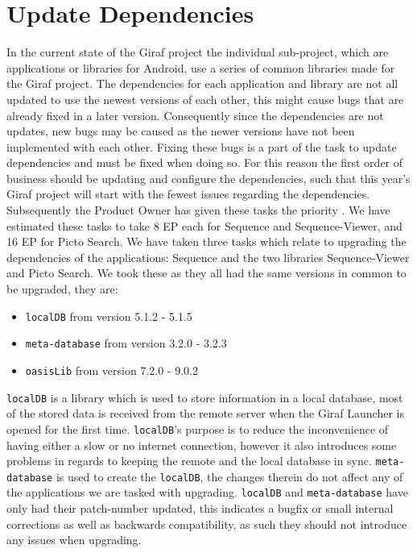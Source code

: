 \section{Update Dependencies}
In the current state of the Giraf project the individual sub-project, which are applications or libraries for Android, use a series of common libraries made for the Giraf project. 
The dependencies for each application and library are not all updated to use the newest versions of each other, this might cause bugs that are already fixed in a later version. 
Consequently since the dependencies are not updates, new bugs may be caused as the newer versions have not been implemented with each other.
Fixing these bugs is a part of the task to update dependencies and must be fixed when doing so.
For this reason the first order of business should be updating and configure the dependencies, such that this year's Giraf project will start with the fewest issues regarding the dependencies. 
Subsequently the Product Owner has given these tasks the priority \phigh. 
We have estimated these tasks to take 8 EP each for Sequence and Sequence-Viewer, and 16 EP for Picto Search. 
We have taken three tasks which relate to upgrading the dependencies of the applications: Sequence and the two libraries Sequence-Viewer and Picto Search. 
We took these as they all had the same versions in common to be upgraded, they are: 
\begin{itemize} 
    \item \texttt{localDB} from version 5.1.2 - 5.1.5 
    \item \texttt{meta-database} from version 3.2.0 - 3.2.3 
    \item \texttt{oasisLib} from version 7.2.0 - 9.0.2 
\end{itemize} 
\texttt{localDB} is a library which is used to store information in a local database, most of the stored data is received from the remote server when the Giraf Launcher is opened for the first time. 
\texttt{localDB}'s purpose is to reduce the inconvenience of having either a slow or no internet connection, however it also introduces some problems in regards to keeping the remote and the local database in sync.  
\texttt{meta-database} is used to create the \texttt{localDB}, the changes therein do not affect any of the applications we are tasked with upgrading. 
\texttt{localDB} and \texttt{meta-database} have only had their patch-number updated, this indicates a bugfix or small internal corrections as well as backwards compatibility, as such they should not introduce any issues when upgrading.
  
